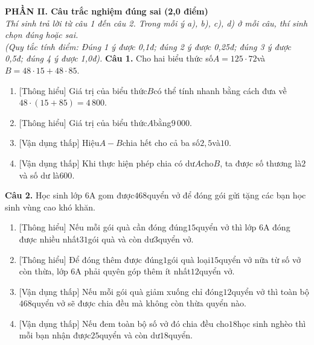 \documentclass[11pt,a4paper]{article}
\begin{document}
\vspace{6pt}
\noindent
\textbf{\large PHẦN II. Câu trắc nghiệm đúng sai (2,0 điểm)}\\
\textit{\small Thí sinh trả lời từ câu 1 đến câu 2. Trong mỗi ý a), b), c), d) ở mỗi câu, thí sinh chọn đúng hoặc sai.}\\
\textit{\small (Quy tắc tính điểm: Đúng 1 ý được 0,1đ; đúng 2 ý được 0,25đ; đúng 3 ý được 0,5đ; đúng 4 ý được 1,0đ).}
\vspace{6pt}
\noindent\textbf{Câu 1.} Cho hai biểu thức số$A = 125 \cdot 72$và$B = 48 \cdot 15 + 48 \cdot 85$.\par\vspace{2pt}
\begin{enumerate}[label=\textbf{\alph*)}, leftmargin=1.2cm, itemsep=2pt, topsep=2pt]
  \item \textnormal{[Thông hiểu]} Giá trị của biểu thức$B$có thể tính nhanh bằng cách đưa về$48 \cdot (15 + 85) = 4\,800$.
  \item \textnormal{[Thông hiểu]} Giá trị của biểu thức$A$bằng$9\,000$.
  \item \textnormal{[Vận dụng thấp]} Hiệu$A - B$chia hết cho cả ba số$2, 5$và$10$.
  \item \textnormal{[Vận dụng thấp]} Khi thực hiện phép chia có dư$A$cho$B$, ta được số thương là$2$và số dư là$600$.
\end{enumerate}
\vspace{6pt}

\noindent\textbf{Câu 2.} Học sinh lớp 6A gom được$468$quyển vở để đóng gói gửi tặng các bạn học sinh vùng cao khó khăn.\par\vspace{2pt}
\begin{enumerate}[label=\textbf{\alph*)}, leftmargin=1.2cm, itemsep=2pt, topsep=2pt]
  \item \textnormal{[Thông hiểu]} Nếu mỗi gói quà cần đóng đúng$15$quyển vở thì lớp 6A đóng được nhiều nhất$31$gói quà và còn dư$3$quyển vở.
  \item \textnormal{[Thông hiểu]} Để đóng thêm được đúng$1$gói quà loại$15$quyển vở nữa từ số vở còn thừa, lớp 6A phải quyên góp thêm ít nhất$12$quyển vở.
  \item \textnormal{[Vận dụng thấp]} Nếu mỗi gói quà giảm xuống chỉ đóng$12$quyển vở thì toàn bộ$468$quyển vở sẽ được chia đều mà không còn thừa quyển nào.
  \item \textnormal{[Vận dụng thấp]} Nếu đem toàn bộ số vở đó chia đều cho$18$học sinh nghèo thì mỗi bạn nhận được$25$quyển và còn dư$18$quyển.
\end{enumerate}
\vspace{6pt}
\end{document}
